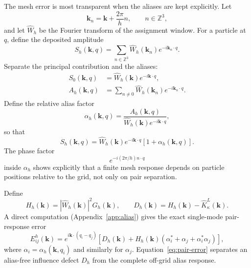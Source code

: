 \documentclass[11pt]{article}
\theoremstyle{plain}
\newcommand{\kk}{\bm k}
\DeclareRobustCommand{\_}{\textunderscore\allowbreak}
\begin{document}
The mesh error is most transparent when the aliases are kept explicitly.
Let
\begin{equation}
\kk_n
=
\kk+\frac{2\pi}{h}n,
\qquad n\in\mathbb Z^3,
\end{equation}
and let $\widehat W_h$ be the Fourier transform of the assignment window.
For a particle at $q$, define the deposited amplitude
\begin{equation}
S_h(\kk,q)
=
\sum_{n\in\mathbb Z^3}
\widehat W_h(\kk_n)e^{-i\kk_n\cdot q}.
\end{equation}
Separate the principal contribution and the aliases:
\begin{align}
S_0(\kk,q)
&=
\widehat W_h(\kk)e^{-i\kk\cdot q},
\\
A_h(\kk,q)
&=
\sum_{n\ne0}
\widehat W_h(\kk_n)e^{-i\kk_n\cdot q}.
\end{align}
Define the relative alias factor
\begin{equation}
\alpha_h(\kk,q)
=
\frac{A_h(\kk,q)}
{\widehat W_h(\kk)e^{-i\kk\cdot q}},
\end{equation}
so that
\begin{equation}
S_h(\kk,q)
=
\widehat W_h(\kk)e^{-i\kk\cdot q}
\left[1+\alpha_h(\kk,q)\right].
\end{equation}
The phase factor
\begin{equation}
e^{-i(2\pi/h)n\cdot q}
\end{equation}
inside $\alpha_h$ shows explicitly that a finite mesh response depends on
particle positions relative to the grid, not only on pair separation.

Define
\begin{equation}
H_h(\kk)
=
|\widehat W_h(\kk)|^2G_h(\kk),
\qquad
D_h(\kk)
=
H_h(\kk)-\widehat K_\kappa^L(\kk).
\end{equation}
A direct computation (Appendix~\ref{app:alias}) gives the exact
single-mode pair-response error
\begin{equation}
\label{eq:pair-error}
E_{ij}^h(\kk)
=
e^{i\kk\cdot(q_i-q_j)}
\left[
D_h(\kk)
+
H_h(\kk)
\left(
\alpha_i^*+\alpha_j+\alpha_i^*\alpha_j
\right)
\right],
\end{equation}
where $\alpha_i=\alpha_h(\kk,q_i)$ and similarly for $\alpha_j$.
Equation~\eqref{eq:pair-error} separates an alias-free influence defect
$D_h$ from the complete off-grid alias response.
\end{document}

